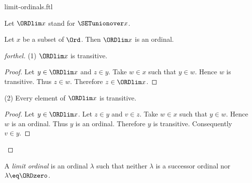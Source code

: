 \documentclass{naproche-library}
\begin{document}
\begin{smodule}[title=Limit Ordinals]{limit-ordinals.ftl}

\begin{convention}[forthel]
  Let $\ORDlim x$ stand for $\SETunionover x$.
\end{convention}

\begin{proposition}[forthel,id=SET_THEORY_02_7202164443185152]
  Let $x$ be a subset of $\Ord$.
  Then $\ORDlim x$ is an ordinal.
\end{proposition}
\begin{proof}[forthel]
  (1) $\ORDlim x$ is transitive.
  \begin{proof}
    Let $y \in \ORDlim x$ and $z \in y$.
    Take $w \in x$ such that $y \in w$.
    Hence $w$ is transitive.
    Thus $z \in w$.
    Therefore $z \in \ORDlim x$.
  \end{proof}

  (2) Every element of $\ORDlim x$ is transitive.
  \begin{proof}
    Let $y \in \ORDlim x$.
    Let $z \in y$ and $v \in z$.
    Take $w \in x$ such that $y \in w$.
    Hence $w$ is an ordinal.
    Thus $y$ is an ordinal.
    Therefore $y$ is transitive.
    Consequently $v \in y$.
  \end{proof}
\end{proof}


\begin{definition}[forthel,id=SET_THEORY_02_7678388934279168]
  A \emph{limit ordinal} is an ordinal $\lambda$ such that neither $\lambda$ is a successor ordinal nor $\lambda \eq \ORDzero$.
\end{definition}
\end{smodule}
\end{document}
